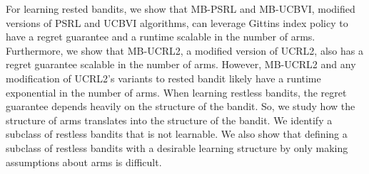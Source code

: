 For learning rested bandits, we show that MB-PSRL and MB-UCBVI, modified versions of PSRL and UCBVI algorithms, can leverage Gittins index policy to have a regret guarantee and a runtime scalable in the number of arms. Furthermore, we show that MB-UCRL2, a modified version of UCRL2, also has a regret guarantee scalable in the number of arms. However, MB-UCRL2 and any modification of UCRL2’s variants to rested bandit likely have a runtime exponential in the number of arms.
When learning restless bandits, the regret guarantee depends heavily on the structure of the bandit.
So, we study how the structure of arms translates into the structure of the bandit.
We identify a subclass of restless bandits that is not learnable.
We also show that defining a subclass of restless bandits with a desirable learning structure by only making assumptions about arms is difficult.

